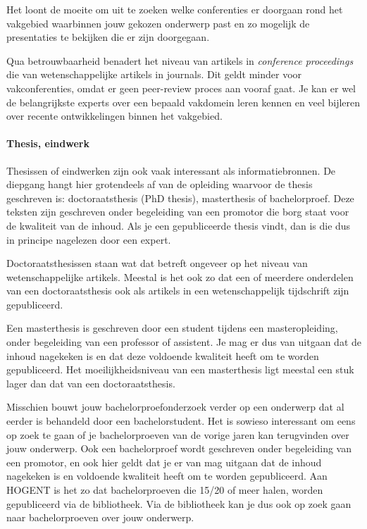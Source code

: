 Het loont de moeite om uit te zoeken welke conferenties er doorgaan rond het vakgebied waarbinnen jouw gekozen onderwerp past en zo mogelijk de presentaties te bekijken die er zijn doorgegaan.

Qua betrouwbaarheid benadert het niveau van artikels in \emph{conference pro\-ceed\-ings} die van wetenschappelijke artikels in journals. Dit geldt minder voor vakconferenties, omdat er geen peer-review proces aan vooraf gaat. Je kan er wel de belangrijkste experts over een bepaald vakdomein leren kennen en veel bijleren over recente ontwikkelingen binnen het vakgebied.

\paragraph{Thesis, eindwerk}

Thesissen of eindwerken zijn ook vaak interessant als informatiebronnen. De diepgang hangt hier grotendeels af van de opleiding waarvoor de thesis geschreven is: doctoraatsthesis (PhD thesis), masterthesis of bachelorproef. Deze teksten zijn geschreven onder begeleiding van een promotor die borg staat voor de kwaliteit van de inhoud. Als je een gepubliceerde thesis vindt, dan is die dus in principe nagelezen door een expert.

Doctoraatsthesissen staan wat dat betreft ongeveer op het niveau van wetenschappelijke artikels. Meestal is het ook zo dat een of meerdere onderdelen van een doctoraatsthesis ook als artikels in een wetenschappelijk tijdschrift zijn gepubliceerd.

Een masterthesis is geschreven door een student tijdens een masteropleiding, onder begeleiding van een professor of assistent. Je mag er dus van uitgaan dat de inhoud nagekeken is en dat deze voldoende kwaliteit heeft om te worden gepubliceerd. Het moeilijkheidsniveau van een masterthesis ligt meestal een stuk lager dan dat van een doctoraatsthesis.

Misschien bouwt jouw bachelorproefonderzoek verder op een onderwerp dat al eerder is behandeld door een bachelorstudent. Het is sowieso interessant om eens op zoek te gaan of je bachelorproeven van de vorige jaren kan terugvinden over jouw onderwerp. Ook een bachelorproef wordt geschreven onder begeleiding van een promotor, en ook hier geldt dat je er van mag uitgaan dat de inhoud nagekeken is en voldoende kwaliteit heeft om te worden gepubliceerd. Aan HOGENT is het zo dat bachelorproeven die 15/20 of meer halen, worden gepubliceerd via de bibliotheek. Via de bibliotheek kan je dus ook op zoek gaan naar bachelorproeven over jouw onderwerp.

